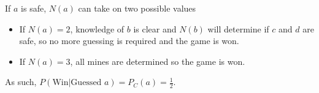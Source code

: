 If $a$ is safe, $N(a)$ can take on two possible values
\begin{center}
    \begin{minipage}{0.25\linewidth}\centering{}\end{minipage}
    \begin{minipage}{0.25\linewidth}\centering{}\end{minipage}
\end{center}
\begin{itemize}
    \item If $N(a)=2$, knowledge of $b$ is clear and $N(b)$ will determine if $c$ and $d$ are safe, so no more guessing is required and the game is won.
    \item If $N(a)=3$, all mines are determined so the game is won.
\end{itemize}
As such, $P(\text{Win}|\text{Guessed $a$})=P_C(a)=\frac{1}{2}$.\\

